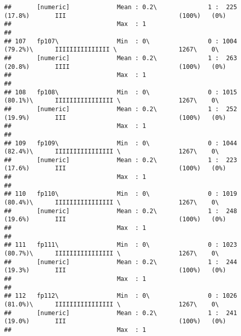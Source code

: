 \documentclass[]{article}
\begin{document}
\begin{verbatim}
##       [numeric]             Mean : 0.2\              1 :  225 (17.8%)       III                               (100%)   (0%)     
##                             Max  : 1                                                                                            
## 
## 107   fp107\                Min  : 0\                0 : 1004 (79.2%)\      IIIIIIIIIIIIIII \                 1267\    0\       
##       [numeric]             Mean : 0.2\              1 :  263 (20.8%)       IIII                              (100%)   (0%)     
##                             Max  : 1                                                                                            
## 
## 108   fp108\                Min  : 0\                0 : 1015 (80.1%)\      IIIIIIIIIIIIIIII \                1267\    0\       
##       [numeric]             Mean : 0.2\              1 :  252 (19.9%)       III                               (100%)   (0%)     
##                             Max  : 1                                                                                            
## 
## 109   fp109\                Min  : 0\                0 : 1044 (82.4%)\      IIIIIIIIIIIIIIII \                1267\    0\       
##       [numeric]             Mean : 0.2\              1 :  223 (17.6%)       III                               (100%)   (0%)     
##                             Max  : 1                                                                                            
## 
## 110   fp110\                Min  : 0\                0 : 1019 (80.4%)\      IIIIIIIIIIIIIIII \                1267\    0\       
##       [numeric]             Mean : 0.2\              1 :  248 (19.6%)       III                               (100%)   (0%)     
##                             Max  : 1                                                                                            
## 
## 111   fp111\                Min  : 0\                0 : 1023 (80.7%)\      IIIIIIIIIIIIIIII \                1267\    0\       
##       [numeric]             Mean : 0.2\              1 :  244 (19.3%)       III                               (100%)   (0%)     
##                             Max  : 1                                                                                            
## 
## 112   fp112\                Min  : 0\                0 : 1026 (81.0%)\      IIIIIIIIIIIIIIII \                1267\    0\       
##       [numeric]             Mean : 0.2\              1 :  241 (19.0%)       III                               (100%)   (0%)     
##                             Max  : 1                                                                                            

\end{verbatim}
\end{document}
